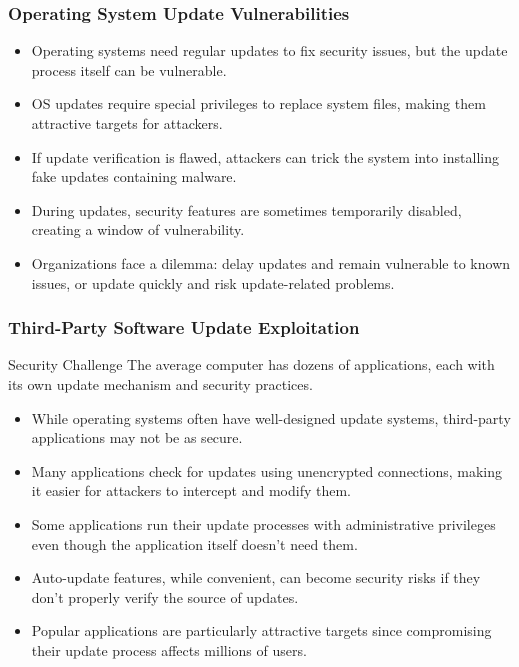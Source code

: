 \documentclass{beamer}
\begin{document}
\begin{frame}
    \frametitle{Operating System Update Vulnerabilities}
    
    \begin{itemize}
        \item Operating systems need regular updates to fix security issues, but the update process itself can be vulnerable.
        \item OS updates require special privileges to replace system files, making them attractive targets for attackers.
        \item If update verification is flawed, attackers can trick the system into installing fake updates containing malware.
        \item During updates, security features are sometimes temporarily disabled, creating a window of vulnerability.
        \item Organizations face a dilemma: delay updates and remain vulnerable to known issues, or update quickly and risk update-related problems.
    \end{itemize}
\end{frame}

\begin{frame}
    \frametitle{Third-Party Software Update Exploitation}
    
    \begin{alertblock}{Security Challenge}
        The average computer has dozens of applications, each with its own update mechanism and security practices.
    \end{alertblock}
    
    \begin{itemize}
        \item While operating systems often have well-designed update systems, third-party applications may not be as secure.
        \item Many applications check for updates using unencrypted connections, making it easier for attackers to intercept and modify them.
        \item Some applications run their update processes with administrative privileges even though the application itself doesn't need them.
        \item Auto-update features, while convenient, can become security risks if they don't properly verify the source of updates.
        \item Popular applications are particularly attractive targets since compromising their update process affects millions of users.
    \end{itemize}
\end{frame}
\end{document}
